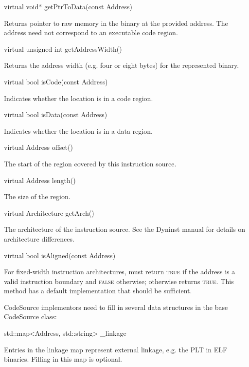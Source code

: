 \documentclass{article}
\newenvironment{apient}{\small\verbatim}{\endverbatim}
\newcommand{\apidesc}[1]{%
{\addtolength{\leftskip}{4em}%
#1\par\medskip}
}
\begin{document}
\begin{apient}
virtual void* getPtrToData(const Address)
\end{apient}
\apidesc{Returns pointer to raw memory in the binary at the provided address. The address need not correspond to an executable code region.}

\begin{apient}
virtual unsigned int getAddressWidth()
\end{apient}
\apidesc{Returns the address width (e.g. four or eight bytes) for the represented binary.}

\begin{apient}
virtual bool isCode(const Address)
\end{apient}
\apidesc{Indicates whether the location is in a code region.}

\begin{apient}
virtual bool isData(const Address)
\end{apient}
\apidesc{Indicates whether the location is in a data region.}

\begin{apient}
virtual Address offset()
\end{apient}
\apidesc{The start of the region covered by this instruction source.}

\begin{apient}
virtual Address length()
\end{apient}
\apidesc{The size of the region.}

\begin{apient}
virtual Architecture getArch()
\end{apient}
\apidesc{The architecture of the instruction source. See the Dyninst manual for details on architecture differences.}

\begin{apient}
virtual bool isAligned(const Address)
\end{apient}
\apidesc{For fixed-width instruction architectures, must return {\scshape true} if the address is a valid instruction boundary and {\scshape false} otherwise; otherwise returns {\scshape true}. This method has a default implementation that should be sufficient.}

CodeSource implementors need to fill in several data structures in the base CodeSource class:

\begin{apient}
std::map<Address, std::string> _linkage
\end{apient}
\apidesc{Entries in the linkage map represent external linkage, e.g. the PLT in ELF binaries. Filling in this map is optional.}
\end{document}
